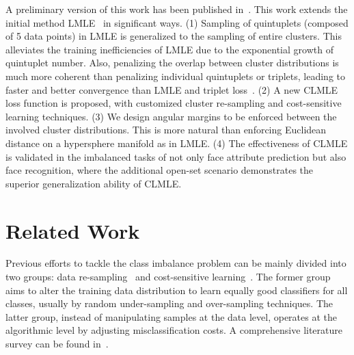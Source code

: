 \documentclass[10pt,journal,compsoc]{IEEEtran}
\begin{document}
A preliminary version of this work has been published in~\cite{huang2016lmle}. This work extends the initial method LMLE~\cite{huang2016lmle} in significant ways. (1) Sampling of quintuplets (composed of 5 data points) in LMLE is generalized to the sampling of entire clusters. This alleviates the training inefficiencies of LMLE due to the exponential growth of quintuplet number. Also, penalizing the overlap between cluster distributions is much more coherent than penalizing individual quintuplets or triplets, leading to faster and better convergence than LMLE and triplet loss~\cite{Schroff15}. (2) A new CLMLE loss function is proposed, with customized cluster re-sampling and cost-sensitive learning techniques. (3) We design angular margins to be enforced between the involved cluster distributions. This is more natural than enforcing Euclidean distance on a hypersphere manifold as in LMLE. (4) The effectiveness of CLMLE is validated in the imbalanced tasks of not only face attribute prediction but also face recognition, where the additional open-set scenario demonstrates the superior generalization ability of CLMLE.

\section{Related Work}
Previous efforts to tackle the class imbalance problem can be mainly divided into two groups: data re-sampling~\cite{He2013,Chawla02,Drummond03,Han05,He09,Maciejewski11,He08adasyn} and cost-sensitive learning~\cite{KRAWCZYK2014554,Tang09,Ting00,Zhou2006AAAI,Chen16}. The former group aims to alter the training data distribution to learn equally good classifiers for all classes, usually by random under-sampling and over-sampling techniques. The latter group, instead of manipulating samples at the data level, operates at the algorithmic level by adjusting misclassification costs. A comprehensive literature survey can be found in~\cite{He09,He2013}.
\end{document}
